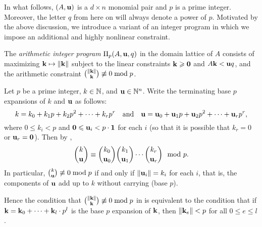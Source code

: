 \documentclass[11pt]{amsart}
\begin{document}
In what follows, $(A, \mathbf{u})$ is a $d \times n$ monomial pair and $p$ is a prime integer.
Moreover, the letter $q$ from here on will always denote a power of $p$.
Motivated by the above discussion, we introduce a variant of an integer program in which we impose an additional and highly nonlinear constraint.

\begin{definition}
\label{aip: D}
The \emph{arithmetic integer program} $\Pi_p(A, \mathbf{u}, q)$ in the domain lattice of $A$ consists of maximizing $\mathbf{k} \mapsto \| \mathbf{k} \|$ subject to the linear constraints $\mathbf{k} \geqslant \mathbf{0}$ and $A \mathbf{k} < \mathbf{u}q$, and the arithmetic constraint $\binom{\| \mathbf{k} \|}{\mathbf{k}} \not \equiv 0 \bmod p$.
\end{definition}


\begin{remark} \label{dickson: R}
Let $p$ be a prime integer, $k\in \mathbb{N}$, and $\mathbf{u} \in \mathbb{N}^n$.
Write the terminating base $p$ expansions of $k$ and $\mathbf{u}$ as follows\textup:
\begin{equation*}
k = k_0+k_1p+k_2p^2+\cdots+k_rp^r\quad \text{and} \quad \mathbf{u}=\mathbf{u}_0+\mathbf{u}_1p+\mathbf{u}_2p^2+\cdots+\mathbf{u}_rp^r,
\end{equation*}
where $0\le k_i < p$ and $\mathbf{0}\leqslant\mathbf{u}_i < p \cdot \mathbf{1}$ for each $i$
(so that it is possible that $k_r = 0$ or $\mathbf{u}_r = \mathbf{0}$).
Then by \cite{dickson.multinomial},
\[
    \binom{k}{\mathbf{u}}\equiv \binom{k_0}{\mathbf{u}_0}\binom{k_1}{\mathbf{u}_1}\cdots \binom{k_r}{\mathbf{u}_r} \mod{p}.
\]
In particular, $\binom{k}{\mathbf{u}}\not\equiv 0\bmod{p}$ if and only if $\| \mathbf{u}_i \|=k_i$ for each $i$, that is, the components of $\mathbf{u}$ add up to $k$ without carrying \textup(base $p$\textup).

Hence the condition that $\binom{\| \mathbf{k} \|}{\mathbf{k}} \not \equiv 0 \bmod p$ in  is equivalent to the condition that
 if $\mathbf{k} = \mathbf{k}_0 + \cdots + \mathbf{k}_l \cdot  p^l$ is the
 base $p$ expansion of $\mathbf{k}$, then $\| \mathbf{k}_e \| < p$ for all $0 \leq e \leq l$.
\end{remark}
\end{document}
